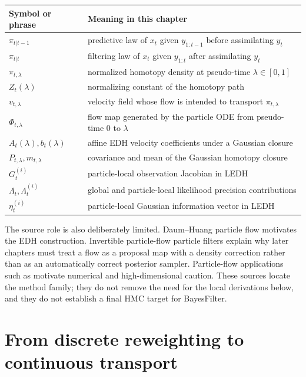 \begin{center}
\small
\begin{tabular}{p{} p{}}
\toprule
Symbol or phrase & Meaning in this chapter \\
\midrule
$\pi_{t|t-1}$ & predictive law of $x_t$ given $y_{1:t-1}$ before assimilating
$y_t$ \\
$\pi_{t|t}$ & filtering law of $x_t$ given $y_{1:t}$ after assimilating
$y_t$ \\
$\pi_{t,\lambda}$ & normalized homotopy density at pseudo-time
$\lambda\in[0,1]$ \\
$Z_t(\lambda)$ & normalizing constant of the homotopy path \\
$v_{t,\lambda}$ & velocity field whose flow is intended to transport
$\pi_{t,\lambda}$ \\
$\Phi_{t,\lambda}$ & flow map generated by the particle ODE from pseudo-time
$0$ to $\lambda$ \\
$A_t(\lambda),b_t(\lambda)$ & affine EDH velocity coefficients under a
Gaussian closure \\
$P_{t,\lambda},m_{t,\lambda}$ & covariance and mean of the Gaussian homotopy
closure \\
$G_t^{(i)}$ & particle-local observation Jacobian in LEDH \\
$\Lambda_t,\Lambda_t^{(i)}$ & global and particle-local likelihood precision
contributions \\
$\eta_t^{(i)}$ & particle-local Gaussian information vector in LEDH \\
\bottomrule
\end{tabular}
\end{center}

The source role is also deliberately limited.  Daum--Huang particle flow
\citep{daumhuang2008} motivates the EDH construction.  Invertible particle-flow
particle filters \citep{li2017particle} explain why later chapters must treat a
flow as a proposal map with a density correction rather than as an automatically
correct posterior sampler.  Particle-flow applications such as
\citet{hu2021particle} motivate numerical and high-dimensional caution.  These
sources locate the method family; they do not remove the need for the local
derivations below, and they do not establish a final HMC target for BayesFilter.

\section{From discrete reweighting to continuous transport}
\label{sec:bf-pff-motivation}

